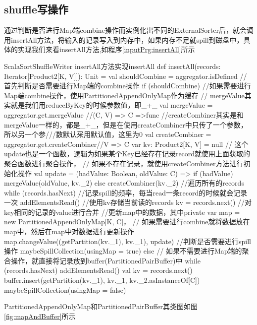 \subsection{shuffle写操作}
通过判断是否进行Map端combine操作而实例化出不同的ExternalSorter后，就会调用insertAll方法，将输入的记录写入到内存中，如果内存不足就spill到磁盘中，具体的实现我们来看insertAll方法,如程序\ref{inputPrg:insertAll}所示
\begin{codeInput}{Scala}{SortShuffleWriter insertAll方法实现}{insertAll}
def insertAll(records: Iterator[Product2[K, V]]): Unit = {
  val shouldCombine = aggregator.isDefined	
  //首先判断是否需要进行Map端的combine操作
  if (shouldCombine) {
    //如果需要进行Map端combine操作，使用PartitionedAppendOnlyMap作为缓存
    // mergeValue其实就是我们用reduceByKey的时候参数值，即_+_
    val mergeValue = aggregator.get.mergeValue
    //(C, V) => C  =>func
    //createCombiner其实是和mergeValue一样的，都是_+_，但是在使用createCombiner中只传了一个参数，所以另一个参///数默认采用默认值，这里为0
    val createCombiner = aggregator.get.createCombiner//V => C
    var kv: Product2[K, V] = null
    // 这个update也是一个函数，逻辑为如果某个Key已经存在记录record就使用上面获取的聚合函数进行聚合操作，
    // 如果不存在记录，就使用createCombiner方法进行初始化操作
    val update = (hadValue: Boolean, oldValue: C) => {
      if (hadValue) mergeValue(oldValue, kv._2) else createCombiner(kv._2)
    }
    //遍历所有的records
    while (records.hasNext) {
      //记录spill的频率，每当read一条record的时候就会记录一次
      addElementsRead()
      //使用kv存储当前读的records
      kv = records.next()
      //对key相同的记录的value进行合并
      //更新map中的数据，其中private var map = new PartitionedAppendOnlyMap[K, C]，
      // 如果需要进行combine就将数据放在map中，然后在map中对数据进行更新操作
      map.changeValue((getPartition(kv._1), kv._1), update)
      //判断是否需要进行spill操作
      maybeSpillCollection(usingMap = true)
    }
  } else {
    // 如果不需要进行Map端的聚合操作，就直接将记录放到buffer(PartitionedPairBuffer)中
    while (records.hasNext) {
      addElementsRead()
      val kv = records.next()
      buffer.insert(getPartition(kv._1), kv._1, kv._2.asInstanceOf[C])
      maybeSpillCollection(usingMap = false)
    }
  }
}
\end{codeInput}
PartitionedAppendOnlyMap和PartitionedPairBuffer其类图如图\ref{fig:mapAndBuffer}所示

